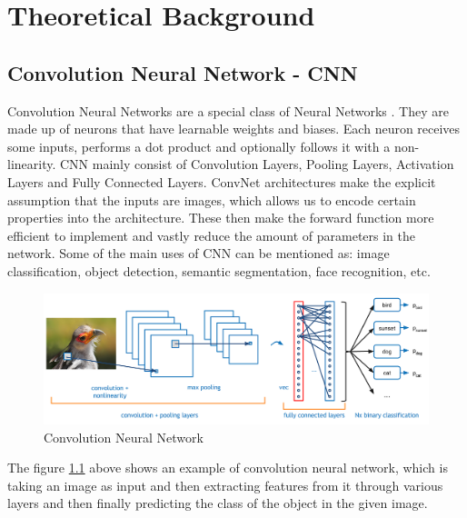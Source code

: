\chapter{Theoretical Background}

\section{Convolution Neural Network - CNN}
Convolution Neural Networks are a special class of Neural Networks \cite{masood2018real}. They are made up
of neurons that have learnable weights and biases. Each neuron receives some inputs,
performs a dot product and optionally follows it with a non-linearity. CNN mainly consist
of Convolution Layers, Pooling Layers, Activation Layers and Fully Connected Layers.
ConvNet architectures make the explicit assumption that the inputs are images,
which allows us to encode certain properties into the architecture. These then
make the forward function more efficient to implement and vastly reduce the amount
of parameters in the network. Some of the main uses of CNN can be mentioned as: image
classification, object detection, semantic segmentation, face recognition, etc.

\begin{figure}[H]
	\centering
	\includegraphics[width=\textwidth]{img/Chap3/Cover.png}
	\caption{Convolution Neural Network}
	\label{fig:Chap3-OverviewTheCNN}
\end{figure}
The figure \ref{fig:Chap3-OverviewTheCNN} above shows an example of convolution neural network, which is taking an image
as input and then extracting features from it through various layers and then finally predicting the
class of the object in the given image.

